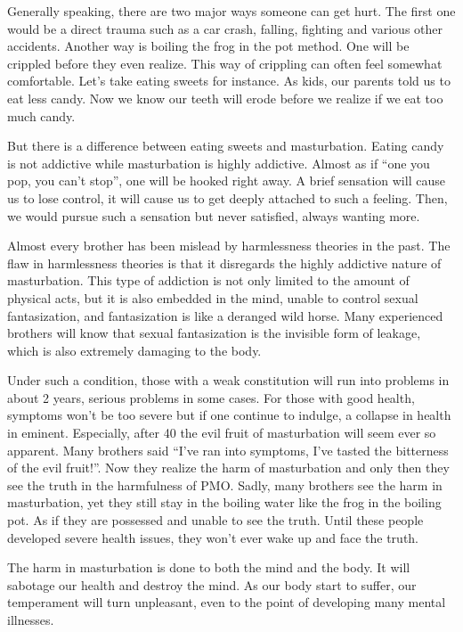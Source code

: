 \documentclass[
]{book}
\begin{document}
Generally speaking, there are two major ways someone can get hurt. The first one would be a direct trauma such as a car crash, falling, fighting and various other accidents. Another way is boiling the frog in the pot method. One will be crippled before they even realize. This way of crippling can often feel somewhat comfortable. Let's take eating sweets for instance. As kids, our parents told us to eat less candy. Now we know our teeth will erode before we realize if we eat too much candy.

But there is a difference between eating sweets and masturbation. Eating candy is not addictive while masturbation is highly addictive. Almost as if ``one you pop, you can't stop'', one will be hooked right away. A brief sensation will cause us to lose control, it will cause us to get deeply attached to such a feeling. Then, we would pursue such a sensation but never satisfied, always wanting more.

Almost every brother has been mislead by harmlessness theories in the past. The flaw in harmlessness theories is that it disregards the highly addictive nature of masturbation. This type of addiction is not only limited to the amount of physical acts, but it is also embedded in the mind, unable to control sexual fantasization, and fantasization is like a deranged wild horse. Many experienced brothers will know that sexual fantasization is the invisible form of leakage, which is also extremely damaging to the body.

Under such a condition, those with a weak constitution will run into problems in about 2 years, serious problems in some cases. For those with good health, symptoms won't be too severe but if one continue to indulge, a collapse in health in eminent. Especially, after 40 the evil fruit of masturbation will seem ever so apparent. Many brothers said ``I've ran into symptoms, I've tasted the bitterness of the evil fruit!''. Now they realize the harm of masturbation and only then they see the truth in the harmfulness of PMO. Sadly, many brothers see the harm in masturbation, yet they still stay in the boiling water like the frog in the boiling pot. As if they are possessed and unable to see the truth. Until these people developed severe health issues, they won't ever wake up and face the truth.

The harm in masturbation is done to both the mind and the body. It will sabotage our health and destroy the mind. As our body start to suffer, our temperament will turn unpleasant, even to the point of developing many mental illnesses.
\end{document}
